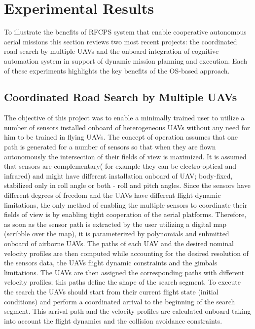 \documentclass[letterpaper, 10 pt, conference]{ieeeconf}  %
\begin{document}
\section{Experimental Results}

To illustrate the benefits of RFCPS system that enable cooperative autonomous aerial missions this section  reviews two most recent projects: the coordinated road search by multiple UAVs and the onboard integration of cognitive automation system in support of dynamic mission planning and execution. Each of these experiments highlights the key benefits of the OS-based approach.

\subsection{Coordinated Road Search by Multiple UAVs} 

The objective of this project was to enable a minimally trained user to utilize a number of  sensors installed onboard of heterogeneous UAVs without any need for him to be trained in flying UAVs. The concept of operation assumes that one path is generated for a number of sensors so that when they are flown autonomously the intersection of their fields of view is maximized. It is assumed that sensors are complementary( for example they can be electro-optical and infrared) and might have different installation onboard of UAV; body-fixed, stabilized only in roll angle or both - roll and pitch angles. Since the sensors have different degrees of freedom and the UAVs have different flight dynamic limitations, the only method of enabling the multiple sensors to coordinate their fields of view is by enabling tight cooperation of the aerial platforms. Therefore, as soon as the sensor path is extracted by the user utilizing a digital map (scribble over the map), it is parameterized by polynomials and submitted onboard of airborne UAVs. The paths of each UAV and the desired nominal velocity profiles are then computed while accounting for the desired resolution of the sensors data, the UAVs flight dynamic constraints and the gimbals limitations. The UAVs are then assigned the corresponding paths with different velocity profiles; this paths define the shape of the search segment. To execute the search the UAVs should start from their current flight state (initial conditions) and perform a coordinated arrival to the beginning of the search segment. This arrival path and the velocity profiles are calculated onboard taking into account the flight dynamics  and the collision avoidance constraints.
\end{document}
